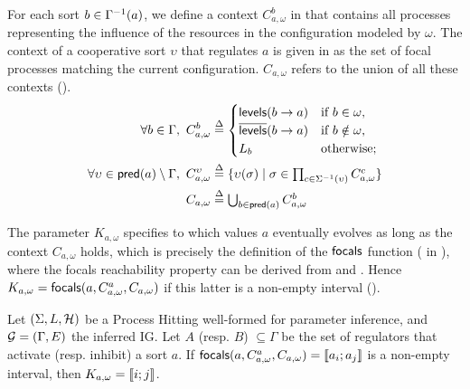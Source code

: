 For each sort $b \in \Gamma^{-1}(a)$, we define a context $C^b_{a,\omega}$ in  that contains all processes representing the influence of the resources in the configuration modeled by $\omega$.
The context of a cooperative sort $\upsilon$ that regulates $a$ is given in
 as the set of focal processes matching the current configuration.
$C_{a,\omega}$ refers to the union of all these contexts ().
\begin{align}
  \label{eq:param_context}
  \forall b\in\Gamma,~
  C_{a,\omega}^b & \stackrel{\Delta}= \begin{cases}
    \mathsf{levels}(b\rightarrow a) & \text{if $b \in \omega$,}\\
    \overline{\mathsf{levels}}(b\rightarrow a) & \text{if $b \notin \omega$,}\\
    L_b            & \text{otherwise;}\\
  \end{cases}
  \\
  \label{eq:param_context_coop}
  \forall \upsilon \in \mathsf{pred}(a)\setminus\Gamma,~
  C_{a,\omega}^\upsilon & \stackrel{\Delta}= \{
  \upsilon(\sigma) \mid \sigma \in \textstyle\prod_{c\in\Sigma^{-1}(\upsilon)}C_{a,\omega}^c \}
  \\
  C_{a,\omega} & \stackrel{\Delta}= \textstyle\bigcup_{b\in\mathsf{pred}(a)} C^b_{a,\omega}
  \label{eq:K-ctx}
\end{align}

The parameter $K_{a,\omega}$ specifies to which values $a$ eventually evolves as long as the context
$C_{a,\omega}$ holds, which is precisely the definition of the $\mathsf{focals}$ function
( in ),
where the focals reachability property can be derived from  and
.
Hence $K_{a,\omega} = \mathsf{focals}(a,C^a_{a,\omega},C_{a,\omega})$ if this latter is a non-empty interval
().

\begin{proposition}
\label{pps:param_K}
Let $(\Sigma, L, \mathcal{H})$ be a Process Hitting well-formed for parameter inference, and $\mathcal{G} = (\Gamma, E)$ the inferred IG.
Let $A$ (resp. $B$) $\subseteq \Gamma$ be the set of regulators that activate (resp. inhibit) a sort
$a$.
If $\mathsf{focals}(a,C^a_{a,\omega},C_{a,\omega})=\llbracket a_i ; a_j \rrbracket$ is a non-empty interval, then $K_{a,\omega} = \llbracket i ; j \rrbracket$.
\end{proposition}

